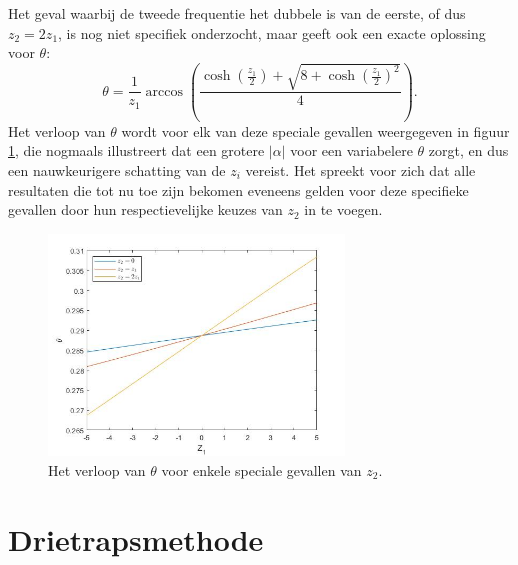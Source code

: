 \documentclass[12pt]{article}
\begin{document}
Het geval waarbij de tweede frequentie het dubbele is van de eerste, of dus \(z_2=2z_1\), is nog niet specifiek onderzocht, maar geeft ook een exacte oplossing voor \(\theta\):
\begin{equation} \label{eq:rks2z2=2z1}
    \theta=\frac{1}{z_1}\arccos\left(\frac{\cosh\left(\frac{z_1}{2}\right)+\sqrt{8+\cosh\left(\frac{z_1}{2}\right)^2}}{4}\right).
\end{equation}
Het verloop van \(\theta\) wordt voor elk van deze speciale gevallen weergegeven in figuur \ref{fig:rks2specials}, die nogmaals illustreert dat een grotere \(|\alpha|\) voor een variabelere \(\theta\) zorgt, en dus een nauwkeurigere schatting van de \(z_i\) vereist. Het spreekt voor zich dat alle resultaten die tot nu toe zijn bekomen eveneens gelden voor deze specifieke gevallen door hun respectievelijke keuzes van \(z_2\) in te voegen.
\begin{figure}[H]
    \centering
    \includegraphics[width=0.7\textwidth]{specials_RKs2.jpg}
    \caption{Het verloop van \(\theta\) voor enkele speciale gevallen van \(z_2\).}
    \label{fig:rks2specials}
\end{figure}

\newpage
\section{Drietrapsmethode} \label{sec:rks3}
\end{document}
